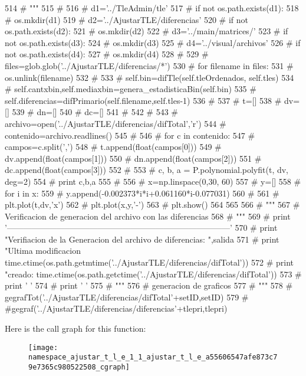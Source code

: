 \begin{DoxyCode}
514 #     """
515 # 
516 #     d1='../TleAdmin/tle'
517 #     if not os.path.exists(d1):
518 #         os.mkdir(d1)
519 #     d2='../AjustarTLE/diferencias'
520 #     if not os.path.exists(d2):
521 #         os.mkdir(d2)
522 #     d3='../main/matrices/'
523 #     if not os.path.exists(d3):
524 #         os.mkdir(d3)
525 #     d4='../visual/archivos'
526 #     if not os.path.exists(d4):
527 #         os.mkdir(d4)
528 #         
529 #     files=glob.glob('../AjustarTLE/diferencias/*')
530 #     for filename in files:
531 #         os.unlink(filename)
532 #         
533 #     self.bin=difTle(self.tleOrdenados, self.tles)
534 #     self.cantxbin,self.mediaxbin=genera_estadisticaBin(self.bin)
535 #     self.diferencias=difPrimario(self.filename,self.tles-1)
536 # 
537 #     t=[]
538 #     dv=[]
539 #     dn=[]
540 #     dc=[]
541 #     
542 #     
543 #     archivo=open('../AjustarTLE/diferencias/difTotal','r')
544 #     contenido=archivo.readlines()
545 #     
546 #     for c in contenido:
547 #         campos=c.split(',')
548 #         t.append(float(campos[0]))
549 #         dv.append(float(campos[1]))
550 #         dn.append(float(campos[2]))
551 #         dc.append(float(campos[3]))
552 #         
553 #     c, b, a = P.polynomial.polyfit(t, dv, deg=2)
554 #     print c,b,a
555 #     
556 #     x=np.linspace(0,30, 60)
557 #     y=[]
558 #     for i in x:
559 #         y.append(-0.002373*i*i+0.061160*i-0.077031)
560 #     
561 #     plt.plot(t,dv,'x')
562 #     plt.plot(x,y,'-')
563 #     plt.show()
564     
565 
566 #     """
567 #     Verificacion de generacion del archivo con las diferencias
568 #     """
569 #     print
       '---------------------------------------------------------------------------------'
570 #     print "Verifiacion de la Generacion del archivo de diferencias: ",salida
571 #     print "Ultima modificacion %
       time.ctime(os.path.getmtime('../AjustarTLE/diferencias/difTotal'))
572 #     print "creado: %
       time.ctime(os.path.getctime('../AjustarTLE/diferencias/difTotal'))
573 #     print ' '
574 #     print ' '
575 #     """
576 #     generacion de graficos
577 #     """ 
578         # gegrafTot('../AjustarTLE/diferencias/difTotal'+setID,setID)
579     
    #     #gegraf('../AjustarTLE/diferencias/diferencias'+tlepri,tlepri)\end{DoxyCode}


\-Here is the call graph for this function\-:\nopagebreak
\begin{figure}[H]
\begin{center}
\leavevmode
\texttt{[image: namespace\_ajustar\_t\_l\_e\_1\_1\_ajustar\_t\_l\_e\_a55606547afe873c79e7365c980522508\_cgraph]}
\end{center}
\end{figure}




